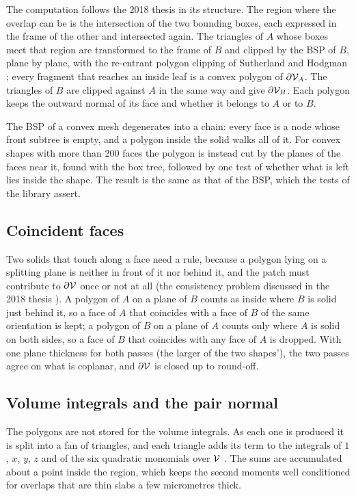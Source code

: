 The computation follows the 2018 thesis \cite{Vilela2018} in its structure. The region where
the overlap can be is the intersection of the two bounding boxes, each expressed in the frame
of the other and intersected again. The triangles of $A$ whose boxes meet that region are
transformed to the frame of $B$ and clipped by the BSP of $B$, plane by plane, with the
re-entrant polygon clipping of Sutherland and Hodgman \cite{Sutherland1974}; every fragment
that reaches an inside leaf is a convex polygon of $\partial\mathcal{V}_A$. The triangles of $B$
are clipped against $A$ in the same way and give $\partial\mathcal{V}_B$. Each polygon keeps the
outward normal of its face and whether it belongs to $A$ or to $B$.

The BSP of a convex mesh degenerates into a chain: every face is a node whose front subtree is
empty, and a polygon inside the solid walks all of it. For convex shapes with more than 200
faces the polygon is instead cut by the planes of the faces near it, found with the box tree,
followed by one test of whether what is left lies inside the shape. The result is the same as
that of the BSP, which the tests of the library assert.

\subsection{Coincident faces}

Two solids that touch along a face need a rule, because a polygon lying on a splitting plane is
neither in front of it nor behind it, and the patch must contribute to $\partial\mathcal{V}$ once
or not at all (the consistency problem discussed in the 2018 thesis \cite{Vilela2018}). A polygon of
$A$ on a plane of $B$ counts as inside where $B$ is solid just behind it, so a face of $A$ that
coincides with a face of $B$ of the same orientation is kept; a polygon of $B$ on a plane of
$A$ counts only where $A$ is solid on both sides, so a face of $B$ that coincides with any face
of $A$ is dropped. With one plane thickness for both passes (the larger of the two shapes'),
the two passes agree on what is coplanar, and $\partial\mathcal{V}$ is closed up to round-off.

\subsection{Volume integrals and the pair normal}

The polygons are not stored for the volume integrals. As each one is produced it is split into
a fan of triangles, and each triangle adds its term to the integrals of $1$, $x$, $y$, $z$ and of
the six quadratic monomials over $\mathcal{V}$ \cite{Mirtich1996,Eberly2002}. The sums are
accumulated about a point inside the region, which keeps the second moments well conditioned
for overlaps that are thin slabs a few micrometres thick.

